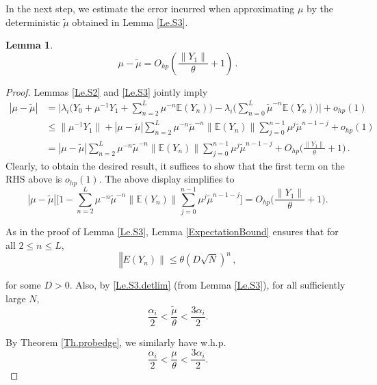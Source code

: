\documentclass[11pt, reqno]{amsart}
\numberwithin{equation}{section}
\newtheorem{lemma}{Lemma}[section]
\newcommand{\E}{\mbox{${\mathbb E}$}}
\begin{document}
In the next step, we estimate the error incurred when approximating $\mu$ by the deterministic $\tilde{\mu}$ obtained in Lemma \ref{Le.S3}.

\begin{lemma}\label{Le.S4}
\[
\mu-\tilde\mu=O_{hp}\left(\frac{\|Y_1\|}{\theta}+1\right)\,.
\]
\end{lemma}

\begin{proof}
Lemmas \ref{Le.S2} and \ref{Le.S3} jointly imply
\begin{align*}
|\mu-\tilde{\mu}|
&= \Big|\lambda_i\Big(Y_0+\mu^{-1}Y_1+\sum_{n=2}^L\mu^{-n}\E(Y_n)\Big) - \lambda_i\Big(\sum_{n=0}^L \tilde{\mu}^{-n}\E(Y_n)\Big)\Big| + o_{hp}(1)\\
&\le \|\mu^{-1}Y_1\| + |\mu-\tilde{\mu}| \sum_{n=2}^L \mu^{-n}\tilde{\mu}^{-n}\|\E(Y_n)\| \sum_{j=0}^{n-1} \mu^j \tilde{\mu}^{n-1-j} + o_{hp}(1)\\
&= |\mu-\tilde{\mu}| \sum_{n=2}^L \mu^{-n}\tilde{\mu}^{-n}\|\E(Y_n)\| \sum_{j=0}^{n-1} \mu^j \tilde{\mu}^{n-1-j} + O_{hp}\Big(\frac{\|Y_1\|}{\theta} + 1\Big)\,.
\end{align*}
Clearly, to obtain the desired result, it suffices to show that the first term on the RHS above is $o_{hp}(1)$. The above display simplifies to
\begin{equation}\label{Le.S4.Target'}
|\mu-\tilde{\mu}|\Bigg[1 - \sum_{n=2}^L \mu^{-n}\tilde{\mu}^{-n}\|\E(Y_n)\| \sum_{j=0}^{n-1} \mu^j \tilde{\mu}^{n-1-j}\Bigg]
= O_{hp}\Big(\frac{\|Y_1\|}{\theta} + 1\Big).
\end{equation}

As in the proof of Lemma \ref{Le.S3}, Lemma \ref{ExpectationBound} ensures that for all $2 \le n \le L$,
\[
\mathbb \|E(Y_n)\| \le \theta\left(D\sqrt{N}\right)^{n}\,,
\]

for some $D>0$. Also, by \eqref{Le.S3.detlim} (from Lemma \ref{Le.S3}), for all sufficiently large $N$,
$$\frac{\alpha_i}{2}<\frac{\tilde{\mu}}{\theta}<\frac{3 \alpha_i}{2}.$$

By Theorem \ref{Th.probedge}, we similarly have w.h.p.
$$\frac{\alpha_i}{2}<\frac{\mu}{\theta}<\frac{3 \alpha_i}{2}.$$


\end{proof}
\end{document}
